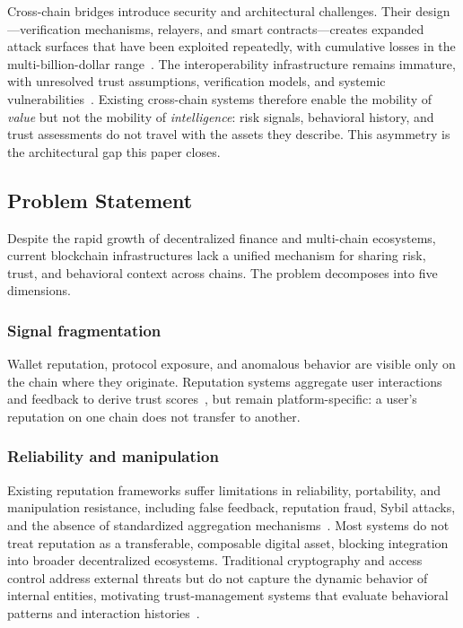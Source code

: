 \documentclass[journal]{IEEEtran}
\begin{document}
Cross-chain bridges introduce security and architectural challenges.
Their design---verification mechanisms, relayers, and smart
contracts---creates expanded attack surfaces that have been exploited
repeatedly, with cumulative losses in the multi-billion-dollar
range~\cite{MishraP25,LiQXZZWX25,augusto2024sok}. The interoperability
infrastructure remains immature, with unresolved trust assumptions,
verification models, and systemic
vulnerabilities~\cite{MishraP25,werner2022sok}. Existing cross-chain
systems therefore enable the mobility of \emph{value} but not the
mobility of \emph{intelligence}: risk signals, behavioral history, and
trust assessments do not travel with the assets they describe. This
asymmetry is the architectural gap this paper closes.

\subsection{Problem Statement}

Despite the rapid growth of decentralized finance and multi-chain
ecosystems, current blockchain infrastructures lack a unified mechanism
for sharing risk, trust, and behavioral context across chains. The
problem decomposes into five dimensions.

\subsubsection*{Signal fragmentation}
Wallet reputation, protocol exposure, and anomalous behavior are
visible only on the chain where they originate. Reputation systems
aggregate user interactions and feedback to derive trust
scores~\cite{HasanBB23}, but remain platform-specific: a user's
reputation on one chain does not transfer to another.

\subsubsection*{Reliability and manipulation}
Existing reputation frameworks suffer limitations in reliability,
portability, and manipulation resistance, including false feedback,
reputation fraud, Sybil attacks, and the absence of standardized
aggregation mechanisms~\cite{AlmasoudHH20}. Most systems do not treat
reputation as a transferable, composable digital asset, blocking
integration into broader decentralized ecosystems. Traditional
cryptography and access control address external threats but do not
capture the dynamic behavior of internal entities, motivating
trust-management systems that evaluate behavioral patterns and
interaction histories~\cite{ArshadKAKYZ23}.
\end{document}
